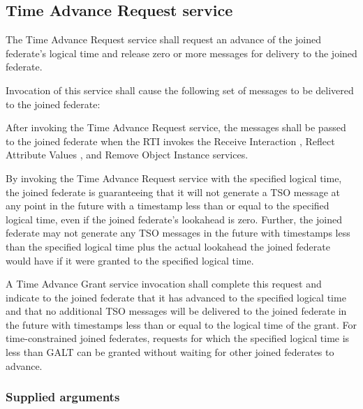 \begin{compactstdpage}

    \subsection{Time Advance Request service}

    The Time Advance Request service shall request an advance of the joined federate's logical time and release zero or more messages for delivery to the joined federate.

    Invocation of this service shall cause the following set of messages to be delivered to the joined federate:


    After invoking the Time Advance Request service, the messages shall be passed to the joined federate when the RTI invokes the Receive Interaction \rtiinitiated{}, Reflect Attribute Values \rtiinitiated{}, and Remove Object Instance \rtiinitiated{} services.

    By invoking the Time Advance Request service with the specified logical time, the joined federate is guaranteeing that it will not generate a TSO message at any point in the future with a timestamp less than or equal to the specified logical time, even if the joined federate's lookahead is zero. Further, the joined federate may not generate any TSO messages in the future with timestamps less than the specified logical time plus the actual lookahead the joined federate would have if it were granted to the specified logical time.

    A Time Advance Grant \rtiinitiated{} service invocation shall complete this request and indicate to the joined federate that it has advanced to the specified logical time and that no additional TSO messages will be delivered to the joined federate in the future with timestamps less than or equal to the logical time of the grant. For time-constrained joined federates, requests for which the specified logical time is less than GALT can be granted without waiting for other joined federates to advance.

    \subsubsection{Supplied arguments}


\end{compactstdpage}
